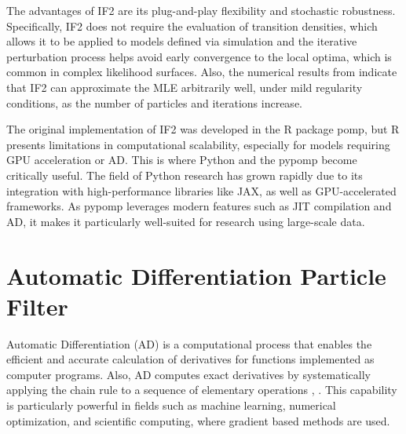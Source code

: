 \documentclass[11pt]{report}
\begin{document}
The advantages of IF2 are its plug-and-play flexibility and stochastic robustness. Specifically, IF2 does not require the evaluation of transition densities, which allows it to be applied to models defined via simulation and the iterative perturbation process helps avoid early convergence to the local optima, which is common in complex likelihood surfaces. Also, the numerical results from \textbf{\citet{ionides2015inference}} indicate that IF2 can approximate the MLE arbitrarily well, under mild regularity conditions, as the number of particles and iterations increase.


The original implementation of IF2 was developed in the R package pomp, but R presents limitations in computational scalability, especially for models requiring GPU acceleration or AD. This is where Python and the pypomp become critically useful. The field of Python research has grown rapidly due to its integration with high-performance libraries like JAX, as well as GPU-accelerated frameworks. As pypomp leverages modern features such as JIT compilation and AD, it makes it particularly well-suited for research using large-scale data.




\newpage
\section{Automatic Differentiation Particle Filter}
Automatic Differentiation (AD) is a computational process that enables the efficient and accurate calculation of derivatives for functions implemented as computer programs. Also, AD computes exact derivatives by systematically applying the chain rule to a sequence of elementary operations \textbf{\citet{rall1996introduction}}, \textbf{\citet{verma2000introduction}}. This capability is particularly powerful in fields such as machine learning, numerical optimization, and scientific computing, where gradient based methods are used.
\end{document}
